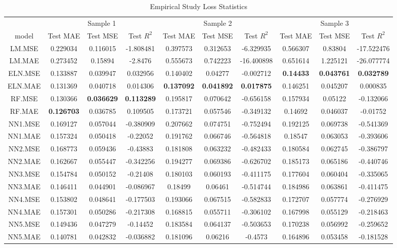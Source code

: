 \begin{table}

\caption{\label{tab:}Empirical Study Loss Statistics}
\centering
\fontsize{6}{8}\selectfont
\begin{tabular}[t]{cccccccccc}
\toprule
\multicolumn{1}{c}{ } & \multicolumn{3}{c}{Sample 1} & \multicolumn{3}{c}{Sample 2} & \multicolumn{3}{c}{Sample 3} \\
\cmidrule(l{3pt}r{3pt}){2-4} \cmidrule(l{3pt}r{3pt}){5-7} \cmidrule(l{3pt}r{3pt}){8-10}
model & Test MAE & Test MSE & Test $R^2$ & Test MAE & Test MSE & Test $R^2$ & Test MAE & Test MSE & Test $R^2$\\
\midrule
LM.MSE & 0.229034 & 0.116015 & -1.808481 & 0.397573 & 0.312653 & -6.329935 & 0.566307 & 0.83804 & -17.522476\\
LM.MAE & 0.273452 & 0.15894 & -2.8476 & 0.555673 & 0.742223 & -16.400898 & 0.651614 & 1.225121 & -26.077774\\
ELN.MSE & 0.133887 & 0.039947 & 0.032956 & 0.140402 & 0.04277 & -0.002712 & \textbf{0.14433} & \textbf{0.043761} & \textbf{0.032789}\\
ELN.MAE & 0.131369 & 0.040718 & 0.014306 & \textbf{0.137092} & \textbf{0.041892} & \textbf{0.017875} & 0.146251 & 0.045207 & 0.000835\\
RF.MSE & 0.130366 & \textbf{0.036629} & \textbf{0.113289} & 0.195817 & 0.070642 & -0.656158 & 0.157934 & 0.05122 & -0.132066\\
RF.MAE & \textbf{0.126703} & 0.036785 & 0.109505 & 0.173721 & 0.057546 & -0.349132 & 0.14692 & 0.046037 & -0.01752\\
NN1.MSE & 0.169127 & 0.057044 & -0.380909 & 0.207662 & 0.074751 & -0.752494 & 0.192125 & 0.069738 & -0.541369\\
NN1.MAE & 0.157324 & 0.050418 & -0.22052 & 0.191762 & 0.066746 & -0.564818 & 0.18547 & 0.063053 & -0.393606\\
NN2.MSE & 0.168773 & 0.059436 & -0.43883 & 0.181808 & 0.063232 & -0.482433 & 0.180584 & 0.062745 & -0.386797\\
NN2.MAE & 0.162667 & 0.055447 & -0.342256 & 0.194277 & 0.069386 & -0.626702 & 0.185173 & 0.065186 & -0.440746\\
NN3.MSE & 0.154784 & 0.050152 & -0.21408 & 0.180103 & 0.060193 & -0.411175 & 0.177604 & 0.060404 & -0.335065\\
NN3.MAE & 0.146411 & 0.044901 & -0.086967 & 0.18499 & 0.06461 & -0.514744 & 0.184986 & 0.063861 & -0.411475\\
NN4.MSE & 0.153802 & 0.048641 & -0.177503 & 0.193066 & 0.067515 & -0.582833 & 0.172707 & 0.057774 & -0.276929\\
NN4.MAE & 0.157301 & 0.050286 & -0.217308 & 0.168815 & 0.055711 & -0.306102 & 0.167998 & 0.055129 & -0.218463\\
NN5.MSE & 0.149436 & 0.047279 & -0.14452 & 0.183584 & 0.064137 & -0.503653 & 0.170238 & 0.056992 & -0.259652\\
NN5.MAE & 0.140781 & 0.042832 & -0.036882 & 0.181096 & 0.06216 & -0.4573 & 0.164896 & 0.053458 & -0.181528\\
\bottomrule
\end{tabular}
\end{table}